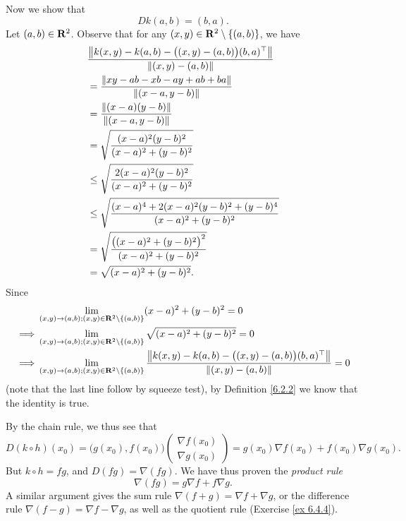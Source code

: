 \begin{example}
    Now we show that
    \[
        D k(a, b) = (b, a).
    \]
    Let \((a, b) \in \R^2\).
    Observe that for any \((x, y) \in \R^2 \setminus \{(a, b)\}\), we have
    \begin{align*}
         & \frac{\norm*{k(x, y) - k(a, b) - \big((x, y) - (a, b)\big) (b, a)^\top}}{\norm*{(x, y) - (a, b)}} \\
         & = \frac{\norm*{xy - ab - xb - ay + ab + ba}}{\norm*{(x - a, y - b)}}                              \\
         & = \frac{\norm*{(x - a)(y - b)}}{\norm*{(x - a, y - b)}}                                           \\
         & = \sqrt{\frac{(x - a)^2 (y - b)^2}{(x - a)^2 + (y - b)^2}}                                        \\
         & \leq \sqrt{\frac{2 (x - a)^2 (y - b)^2}{(x - a)^2 + (y - b)^2}}                                   \\
         & \leq \sqrt{\frac{(x - a)^4 + 2 (x - a)^2 (y - b)^2 + (y - b)^4}{(x - a)^2 + (y - b)^2}}           \\
         & = \sqrt{\frac{\big((x - a)^2 + (y - b)^2\big)^2}{(x - a)^2 + (y - b)^2}}                          \\
         & = \sqrt{(x - a)^2 + (y - b)^2}.
    \end{align*}
    Since
    \begin{align*}
                 & \lim_{(x, y) \to (a, b) ; (x, y) \in \R^2 \setminus \{(a, b)\}} (x - a)^2 + (y - b)^2 = 0                                                                             \\
        \implies & \lim_{(x, y) \to (a, b) ; (x, y) \in \R^2 \setminus \{(a, b)\}} \sqrt{(x - a)^2 + (y - b)^2} = 0                                                                      \\
        \implies & \lim_{(x, y) \to (a, b) ; (x, y) \in \R^2 \setminus \{(a, b)\}} \frac{\norm*{k(x, y) - k(a, b) - \big((x, y) - (a, b)\big) (b, a)^\top}}{\norm*{(x, y) - (a, b)}} = 0
    \end{align*}
    (note that the last line follow by squeeze test),
    by Definition \ref{6.2.2} we know that the identity is true.

    By the chain rule, we thus see that
    \[
        D (k \circ h)(x_0) = \big(g(x_0), f(x_0)\big) \begin{pmatrix}
            \nabla f(x_0) \\
            \nabla g(x_0)
        \end{pmatrix} = g(x_0) \nabla f(x_0) + f(x_0) \nabla g(x_0).
    \]
    But \(k \circ h = fg\), and \(D (fg) = \nabla (fg)\).
    We have thus proven the \emph{product rule}
    \[
        \nabla (fg) = g \nabla f + f \nabla g.
    \]
    A similar argument gives the sum rule \(\nabla (f + g) = \nabla f + \nabla g\), or the difference rule \(\nabla (f - g) = \nabla f - \nabla g\), as well as the quotient rule (Exercise \ref{ex 6.4.4}).
\end{example}

